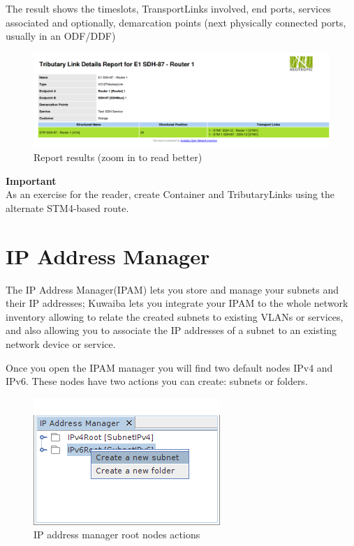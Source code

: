 \documentclass[a4paper]{article}
\begin{document}
		The result shows the timeslots, TransportLinks involved, end ports, services associated and optionally, demarcation points (next physically connected ports, usually in an ODF/DDF)
		\begin{figure}[h!]
			\centering
			\includegraphics[width=\linewidth]{img/sdh_module_tributary_link_report.png}
			\caption{Report results (zoom in to read better)}
			\label{fig:sdh_module_tributary_link_report}
			\end{figure}
		
		\begin{framed} {\large \textbf{Important}}\\
			As an exercise for the reader, create Container and TributaryLinks using the alternate STM4-based route.
		\end{framed}	
		
		\clearpage
		\section{IP Address Manager}\label{sec:ip_address_manager}
		The IP Address Manager(IPAM) lets you store and manage your subnets and their IP addresses; Kuwaiba lets you integrate your IPAM to the whole network inventory allowing to relate the created subnets to existing VLANs or services, and also allowing you to associate the IP addresses of a subnet to an existing network device or service.
		
		Once you open the IPAM manager you will find two default nodes IPv4 and IPv6.
		These nodes have two actions you can create: subnets or folders.
		\begin{figure}[h!]
			\centering
			\includegraphics[width=0.4\linewidth]{img/ipam_root_nodes_actions.png}
			\caption{IP address manager root nodes actions}
			\label{fig:ipam_root_nodes_actions}
		\end{figure}
		
\end{document}
